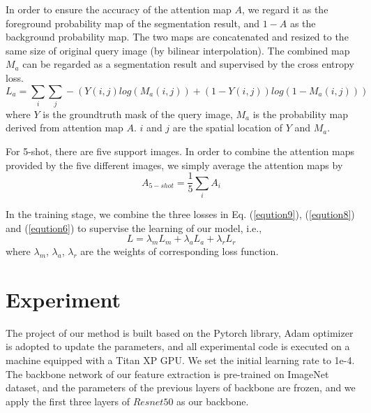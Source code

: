 \documentclass[runningheads]{llncs}
\begin{document}
In order to ensure the accuracy of the attention map $A$, we regard it as the foreground probability map of the segmentation result, and $1-A$ as the background probability map. The two maps are concatenated and resized to the same size of original query image (by bilinear interpolation). The combined map $M_a$ can be regarded as a segmentation result and supervised by the cross entropy loss.
\begin{equation}
L_a = \sum_{i}\sum_{j}-(Y(i, j)log(M_a(i, j)) + (1-Y(i, j))log(1-M_a(i, j)))
 \label{eqution8}
\end{equation}
where $Y$ is the groundtruth mask of the query image, $M_a$ is the probability map derived from attention map $A$. $i$ and $j$ are the spatial location of $Y$ and $M_a$.

For 5-shot, there are five support images. In order to combine the attention maps provided by the five different images, we simply average the attention maps by
\begin{equation}
A_{5-shot} = \frac{1}{5} \sum_i A_i
 \label{eqution11}
\end{equation}


In the training stage, we combine the three losses in Eq. (\ref{eqution9}), (\ref{eqution8}) and (\ref{eqution6}) to supervise the learning of our model, i.e., 
\begin{equation}
L = \lambda_mL_m + \lambda_aL_a + \lambda_rL_r
 \label{eqution10}
\end{equation}
where $\lambda_m$, $\lambda_a$, $\lambda_r$ are the weights of corresponding loss function.


\section{Experiment}

The project of our method is built based on the Pytorch library, Adam\cite{ref_adam} optimizer is adopted to update the parameters, and all experimental code is executed on a machine equipped with a Titan XP GPU. We set the initial learning rate to 1e-4. The backbone network of our feature extraction is pre-trained on ImageNet \cite{ref_imagenet} dataset, and the parameters of the previous layers of backbone are frozen, and we apply the first three layers of $Resnet50$ \cite{ref_resnet} as our backbone.
\end{document}
